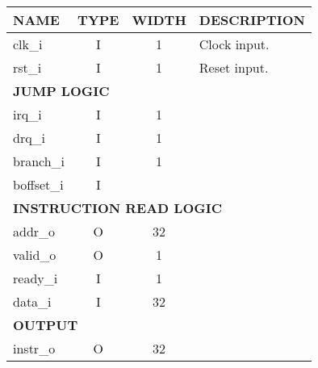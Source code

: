 {
\footnotesize
\begin{tabularx}{0.9\textwidth}{|l|c|c|X|}
  \hline
  \cellcolor{gray!20}\textbf{NAME} & \cellcolor{gray!20}\textbf{TYPE} & \cellcolor{gray!20}\textbf{WIDTH} & \cellcolor{gray!20}\textbf{DESCRIPTION} \\
  \hline
  clk\_i & I & 1 & Clock input. \\
  \hline
  rst\_i & I & 1 & Reset input. \\
  \hline
  \multicolumn{4}{|l|}{\textbf{JUMP LOGIC}} \\
  \hline
  irq\_i & I & 1 &  \\
  \hline
  drq\_i & I & 1 &  \\
  \hline
  branch\_i & I & 1 &  \\
  \hline
  boffset\_i & I &  &  \\
  \hline
  \multicolumn{4}{|l|}{\textbf{INSTRUCTION READ LOGIC}} \\
  \hline
  addr\_o & O & 32 &  \\
  \hline
  valid\_o & O & 1 &  \\
  \hline
  ready\_i & I & 1 &  \\
  \hline
  data\_i & I & 32 &  \\
  \hline
  \multicolumn{4}{|l|}{\textbf{OUTPUT}} \\
  \hline
  instr\_o & O & 32 &  \\
  \hline
\end{tabularx}
}

